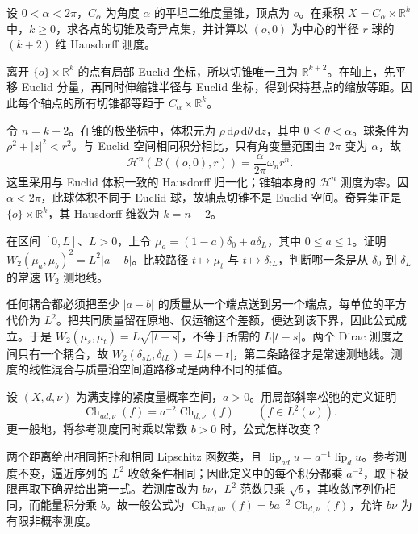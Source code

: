 \begin{exercise}\label{g3:ex:cone-product-singular-axis}
	设 \(0<\alpha<2\pi\)，\(C_\alpha\) 为角度 \(\alpha\) 的平坦二维度量锥，顶点为 \(o\)。在乘积 \(X=C_\alpha\times\mathbb R^k\) 中，\(k\ge0\)，求各点的切锥及奇异点集，并计算以 \((o,0)\) 为中心的半径 \(r\) 球的 \((k+2)\) 维 Hausdorff 测度。
\end{exercise}
\begin{solution}
	离开 \(\{o\}\times\mathbb R^k\) 的点有局部 Euclid 坐标，所以切锥唯一且为 \(\mathbb R^{k+2}\)。在轴上，先平移 Euclid 分量，再同时伸缩锥半径与 Euclid 坐标，得到保持基点的缩放等距。因此每个轴点的所有切锥都等距于 \(C_\alpha\times\mathbb R^k\)。

	令 \(n=k+2\)。在锥的极坐标中，体积元为 \(\rho\,\mathrm d\rho\,\mathrm d\theta\,\mathrm dz\)，其中 \(0\le\theta<\alpha\)。球条件为 \(\rho^2+|z|^2<r^2\)。与 Euclid 空间相同积分相比，只有角变量范围由 \(2\pi\) 变为 \(\alpha\)，故
	\[
		\mathcal H^n(B((o,0),r))=\frac{\alpha}{2\pi}\omega_nr^n.
	\]
	这里采用与 Euclid 体积一致的 Hausdorff 归一化；锥轴本身的 \(\mathcal H^n\) 测度为零。因 \(\alpha<2\pi\)，此球体积不同于 Euclid 球，故轴点切锥不是 Euclid 空间。奇异集正是 \(\{o\}\times\mathbb R^k\)，其 Hausdorff 维数为 \(k=n-2\)。
\end{solution}

\begin{exercise}\label{g3:ex:two-point-transport}
	在区间 \([0,L]\)、\(L>0\)，上令 \(\mu_a=(1-a)\delta_0+a\delta_L\)，其中 \(0\le a\le1\)。证明 \(W_2(\mu_a,\mu_b)^2=L^2|a-b|\)。比较路径 \(t\mapsto\mu_t\) 与 \(t\mapsto\delta_{tL}\)，判断哪一条是从 \(\delta_0\) 到 \(\delta_L\) 的常速 \(W_2\) 测地线。
\end{exercise}
\begin{solution}
	任何耦合都必须把至少 \(|a-b|\) 的质量从一个端点送到另一个端点，每单位的平方代价为 \(L^2\)。把共同质量留在原地、仅运输这个差额，便达到该下界，因此公式成立。于是 \(W_2(\mu_s,\mu_t)=L\sqrt{|t-s|}\)，不等于所需的 \(L|t-s|\)。两个 Dirac 测度之间只有一个耦合，故 \(W_2(\delta_{sL},\delta_{tL})=L|s-t|\)，第二条路径才是常速测地线。测度的线性混合与质量沿空间道路移动是两种不同的插值。
\end{solution}

\begin{exercise}\label{g3:ex:cheeger-scaling}
	设 \((X,d,\nu)\) 为满支撑的紧度量概率空间，\(a>0\)。用局部斜率松弛的定义证明
	\[
		\operatorname{Ch}_{ad,\nu}(f)=a^{-2}\operatorname{Ch}_{d,\nu}(f)
		\qquad(f\in L^2(\nu)).
	\]
	更一般地，将参考测度同时乘以常数 \(b>0\) 时，公式怎样改变？
\end{exercise}
\begin{solution}
	两个距离给出相同拓扑和相同 Lipschitz 函数类，且 \(\operatorname{lip}_{ad}u=a^{-1}\operatorname{lip}_du\)。参考测度不变，逼近序列的 \(L^2\) 收敛条件相同；因此定义中的每个积分都乘 \(a^{-2}\)，取下极限再取下确界给出第一式。若测度改为 \(b\nu\)，\(L^2\) 范数只乘 \(\sqrt b\)，其收敛序列仍相同，而能量积分乘 \(b\)。故一般公式为 \(\operatorname{Ch}_{ad,b\nu}(f)=ba^{-2}\operatorname{Ch}_{d,\nu}(f)\)，允许 \(b\nu\) 为有限非概率测度。
\end{solution}

